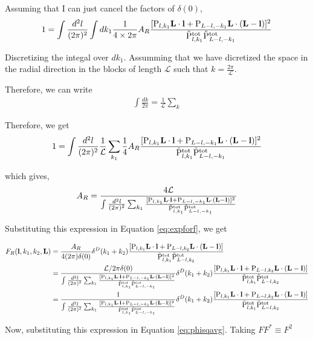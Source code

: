 \documentclass[12pt]{article}
\newcommand{\beq}{\begin{equation}}
\newcommand{\eeq}{\end{equation}}
\newcommand{\beqa}{\begin{eqnarray}}
\newcommand{\eeqa}{\end{eqnarray}}
\newcommand{\beqal}{\begin{aligned}}
\newcommand{\eeqal}{\end{aligned}}
\def\l{{\bf l}}
\def\L{{\bf L}}
\def\pul{{\rm P}}
\def\ptot{{\tilde{\rm P}^{\rm tot}}}
\def\d2l{\frac{d^2l}{(2\pi)^2}}
\def\lbox{\mathcal{L}}
\numberwithin{equation}{section}
\begin{document}
Assuming that I can just cancel the factors of $ \delta(0) $, 
\beq
\beqal
1 = \int \d2l \int dk_1 \frac{1}{4\times2\pi} A_R \frac{[\pul_{l,k_1} \L\cdot \l +
	\pul_{L-l,-k_1} \L\cdot (\L-\l)]^2}{\ptot_{l,k_1}\ptot_{L-l,-k_1}} 
\eeqal
\eeq

Discretizing the integal over $ dk_1 $. Assumming that we have dicretized the space in the radial direction in the blocks of length $ \mathcal{L} $ such that $ k = \frac{2\pi}{\lbox} $.

Therefore, we can write 
\beqa
\int \frac{dk}{2 \pi} = \frac{1}{\lbox} \sum_k
\eeqa

Therefore, we get
\beqa
1 = \int \d2l \frac{1}{\lbox} \sum_{k_1} \frac{1}{4} A_R \frac{[\pul_{l,k_1} \L\cdot \l +
	\pul_{L-l,-k_1} \L\cdot (\L-\l)]^2}{\ptot_{l,k_1}\ptot_{L-l,-k_1}} 
\eeqa

which gives, 
\beqa
A_R = \frac{4 \lbox}{\int \frac{d^2 l}{(2\pi)^2} \sum_{k_1} \frac{[\pul_{l,k_1} \L\cdot \l +
		\pul_{L-l,-k_1} \L\cdot (\L-\l)]^2}{\ptot_{l,k_1}\ptot_{L-l,-k_1}} }  
\eeqa

%

Substituting this expression in Equation \ref{eq:expforf}, we get

\beq
\beqal
F_R(\l,k_1,k_2,\L) &= \frac{A_R }{4 (2\pi) \delta(0) }\delta^D(k_1+k_2) \frac{[\pul_{l,k_1} \L\cdot \l +
	\pul_{L-l,k_2} \L\cdot (\L-\l)]}{\ptot_{l,k_1}\ptot_{L-l,k_2}}
\\
&=  \frac{\lbox / 2\pi \delta(0)}{\int \frac{d^2 l}{(2\pi)^2} \sum_{k_1} \frac{[\pul_{l,k_1} \L\cdot \l +
		\pul_{L-l,-k_1} \L\cdot (\L-\l)]^2}{\ptot_{l,k_1}\ptot_{L-l,-k_1}} }   \delta^D(k_1+k_2) \frac{[\pul_{l,k_1} \L\cdot \l +
	\pul_{L-l,k_2} \L\cdot (\L-\l)]}{\ptot_{l,k_1}\ptot_{L-l,k_2}}\\
&=  \frac{1}{\int \frac{d^2 l}{(2\pi)^2} \sum_{k_1} \frac{[\pul_{l,k_1} \L\cdot \l +
		\pul_{L-l,-k_1} \L\cdot (\L-\l)]^2}{\ptot_{l,k_1}\ptot_{L-l,-k_1}} }   \delta^D(k_1+k_2) \frac{[\pul_{l,k_1} \L\cdot \l +
	\pul_{L-l,k_2} \L\cdot (\L-\l)]}{\ptot_{l,k_1}\ptot_{L-l,k_2}}
\eeqal
\eeq

Now, substituting this expression in Equation \ref{eq:phisqavg}. Taking $ FF^* \equiv F^2 $
\end{document}
